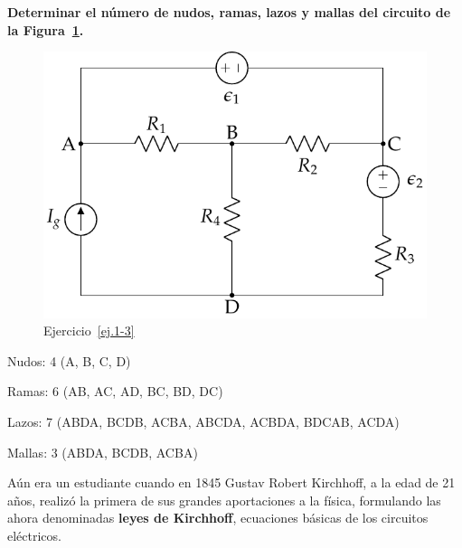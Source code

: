 \documentclass[11pt]{book} %
\begin{document}
	\vspace{4mm}
	\begin{example}\label{ej.1-3}
		\textbf{Determinar el número de nudos, ramas, lazos y mallas del circuito de la Figura~\ref{fig.mallas}.}
		\begin{figure}[H]
			\centering
			\includegraphics[width=0.3\linewidth]{../figs/mallas.pdf}
			\caption{Ejercicio~\ref{ej.1-3}}
			\label{fig.mallas}
		\end{figure}
		
		Nudos: 4 (A, B, C, D)
		
		Ramas: 6 (AB, AC, AD, BC, BD, DC)
		
		Lazos: 7 (ABDA, BCDB, ACBA, ABCDA, ACBDA, BDCAB, ACDA) 
		
		Mallas: 3 (ABDA, BCDB, ACBA)
	\end{example}
	
	
	Aún era un estudiante cuando en 1845 Gustav Robert Kirchhoff, a la edad de 21 años, realizó la primera de sus grandes aportaciones a la física, formulando las ahora denominadas \textbf{leyes de Kirchhoff}, ecuaciones básicas de los circuitos eléctricos.
	
\end{document}
